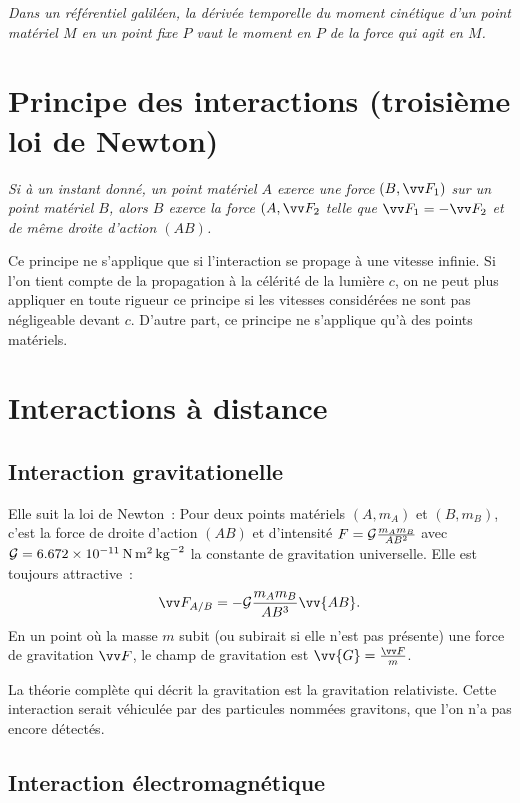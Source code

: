 \emph{Dans un référentiel galiléen, la dérivée temporelle du moment cinétique d'un point matériel $M$ en un point fixe $P$ vaut le moment en $P$ de la force qui agit en $M$.}

\section{Principe des interactions (troisième loi de Newton)}
\label{chap2-sec:principedesinteractions}

\emph{Si à un instant donné, un point matériel $A$ exerce une force $(B,\vF_1)$ sur un point matériel $B$, alors $B$ exerce la force $(A, \vF_2$ telle que $\vF_1 =-\vF_2$ et de même droite d'action $(AB)$.}  

Ce principe ne s'applique que si l'interaction se propage à une vitesse infinie. Si l'on tient compte de la propagation à la célérité de la lumière $c$, on ne peut plus appliquer en toute rigueur ce principe si les vitesses considérées ne sont pas négligeable devant $c$. D'autre part, ce principe ne s'applique qu'à des points matériels.

\section{Interactions à distance}
\label{chap2-sec:interactionsadistance}

\subsection{Interaction gravitationelle}
\label{chap2-subsec:interactiongravitationelle}

Elle suit la loi de Newton~: Pour deux points matériels $(A, m_A)$ et $(B, m_B)$, c'est la force de droite d'action $(AB)$ et d'intensité $F=\mathcal{G} \frac{m_A m_B}{AB^2}$ avec $\mathcal{G} = \SI{6,672e-11}{N.m^2.kg^{-2}}$ la constante de gravitation universelle. Elle est toujours attractive~:
\begin{equation}
  \vF_{A/B} = -\Gb \frac{m_A m_B}{AB^3}\vv{AB}.
\end{equation}
En un point où la masse $m$ subit (ou subirait si elle n'est pas présente) une force de gravitation $\vF$, le champ de gravitation est $\vv{G}=\frac{\vF}{m}$.

La théorie complète qui décrit la gravitation est la gravitation relativiste. Cette interaction serait véhiculée par des particules nommées gravitons, que l'on n'a pas encore détectés.

\subsection{Interaction électromagnétique}
\label{chap2-subsec:interactionelectromagnetique}

